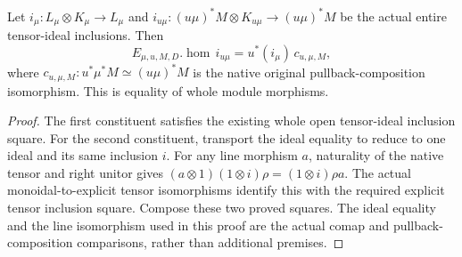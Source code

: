 \begin{theorem}
\label{thm:resume-original-whole-open-target-inclusion}
\leanok
Let $i_\mu:L_\mu\otimes K_\mu\to L_\mu$ and
$i_{u\mu}:(u\mu)^*M\otimes K_{u\mu}\to(u\mu)^*M$ be the actual
entire tensor-ideal inclusions. Then
\[
 E_{\mu,u,M,D}.\operatorname{hom}\,i_{u\mu}
   =u^*(i_\mu)\,c_{u,\mu,M},
\]
where $c_{u,\mu,M}:u^*\mu^*M\simeq(u\mu)^*M$ is the native original
pullback-composition isomorphism. This is equality of whole module morphisms.
\end{theorem}
\begin{proof}
The first constituent satisfies the existing whole open tensor-ideal inclusion
square. For the second constituent, transport the ideal equality to reduce to
one ideal and its same inclusion $i$. For any line morphism $a$, naturality of
the native tensor and right unitor gives
$(a\otimes1)(1\otimes i)\rho=(1\otimes i)\rho a$.
The actual monoidal-to-explicit tensor isomorphisms identify this with the
required explicit tensor inclusion square. Compose these two proved squares.
The ideal equality and the line isomorphism used in this proof are the actual
comap and pullback-composition comparisons, rather than additional premises.
\end{proof}

